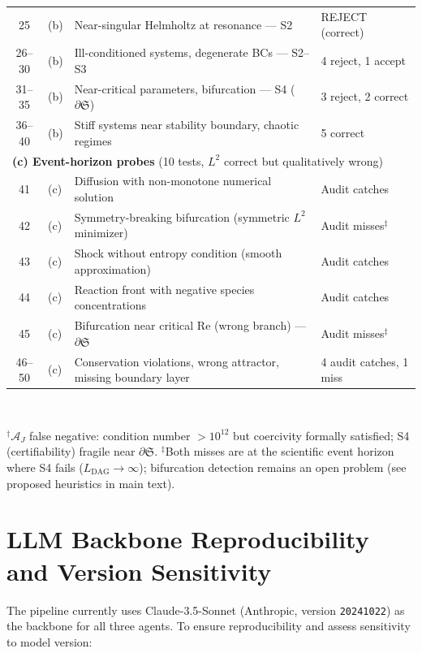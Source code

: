 \documentclass[11pt,a4paper]{article}
\newcommand{\Sclass}{\mathfrak{S}}
\newcommand{\Agent}{\mathcal{A}}
\begin{document}
\begin{table}[htbp]
\begin{tabularx}{\textwidth}{clXl}
25 & (b) & Near-singular Helmholtz at resonance --- S2 & REJECT (correct) \\
26--30 & (b) & Ill-conditioned systems, degenerate BCs --- S2--S3 & 4 reject, 1 accept \\
31--35 & (b) & Near-critical parameters, bifurcation --- S4 ($\partial \Sclass$) & 3 reject, 2 correct \\
36--40 & (b) & Stiff systems near stability boundary, chaotic regimes & 5 correct \\
\midrule
\multicolumn{4}{l}{\textbf{(c) Event-horizon probes} (10 tests, $L^2$ correct but qualitatively wrong)} \\
41 & (c) & Diffusion with non-monotone numerical solution & Audit catches \\
42 & (c) & Symmetry-breaking bifurcation (symmetric $L^2$ minimizer) & Audit misses$^\ddagger$ \\
43 & (c) & Shock without entropy condition (smooth approximation) & Audit catches \\
44 & (c) & Reaction front with negative species concentrations & Audit catches \\
45 & (c) & Bifurcation near critical Re (wrong branch) --- $\partial \Sclass$ & Audit misses$^\ddagger$ \\
46--50 & (c) & Conservation violations, wrong attractor, missing boundary layer & 4 audit catches, 1 miss \\
\bottomrule
\end{tabularx}\\[3pt]
\raggedright\scriptsize $^\dagger$$\Agent_J$ false negative: condition number $> 10^{12}$ but coercivity formally satisfied; S4 (certifiability) fragile near $\partial \Sclass$. $^\ddagger$Both misses are at the scientific event horizon where S4 fails ($L_{\text{DAG}} \to \infty$); bifurcation detection remains an open problem (see proposed heuristics in main text).
\end{table}

\section{LLM Backbone Reproducibility and Version Sensitivity}
\label{sec:s7}

The pipeline currently uses Claude-3.5-Sonnet (Anthropic, version \texttt{20241022}) as the backbone for all three agents. To ensure reproducibility and assess sensitivity to model version:
\end{document}
